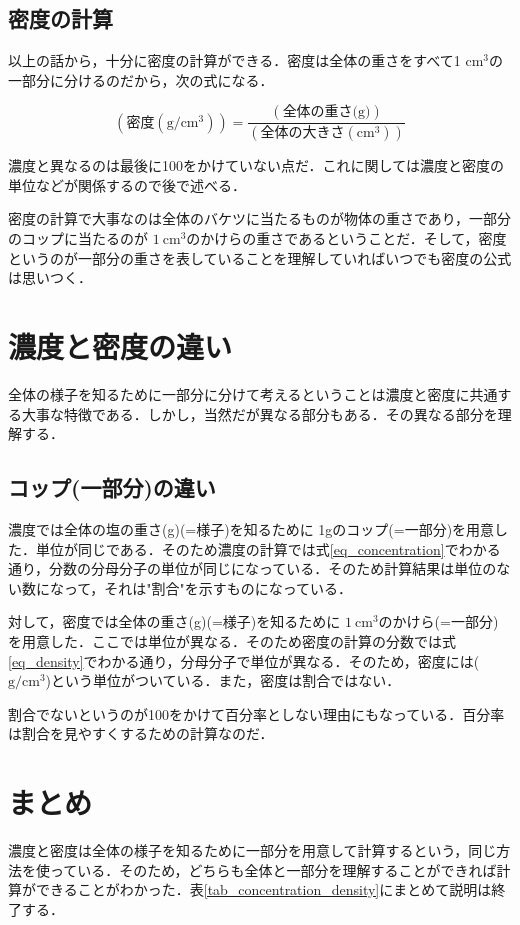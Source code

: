 \documentclass[dvipdfmx]{jsarticle}
\begin{document}
    \subsection{密度の計算}
    以上の話から，十分に密度の計算ができる．密度は全体の重さをすべて1 \(\mathrm{cm}^3\)の一部分に分けるのだから，次の式になる．

    \begin{equation}
        (\text{密度}(\mathrm{g}/\mathrm{cm}^3)) = \frac{(\text{全体の重さ(g)})}{(\text{全体の大きさ}(\mathrm{cm}^3))}
        \label{eq_density}
    \end{equation}

    濃度と異なるのは最後に100をかけていない点だ．これに関しては濃度と密度の単位などが関係するので後で述べる．

    密度の計算で大事なのは全体のバケツに当たるものが物体の重さであり，一部分のコップに当たるのが \(1\ \mathrm{cm}^3\)のかけらの重さであるということだ．そして，密度というのが一部分の重さを表していることを理解していればいつでも密度の公式は思いつく．


    \section{濃度と密度の違い}
    全体の様子を知るために一部分に分けて考えるということは濃度と密度に共通する大事な特徴である．しかし，当然だが異なる部分もある．その異なる部分を理解する．

    \subsection{コップ(一部分)の違い}
    濃度では全体の塩の重さ(g)(=様子)を知るために 1gのコップ(=一部分)を用意した．単位が同じである．そのため濃度の計算では式\eqref{eq_concentration}でわかる通り，分数の分母分子の単位が同じになっている．そのため計算結果は単位のない数になって，それは"割合"を示すものになっている．

    対して，密度では全体の重さ(g)(=様子)を知るために \(1\ \mathrm{cm}^3\)のかけら(=一部分)を用意した．ここでは単位が異なる．そのため密度の計算の分数では式\eqref{eq_density}でわかる通り，分母分子で単位が異なる．そのため，密度には(\(\mathrm{g}/\mathrm{cm}^3\))という単位がついている．また，密度は割合ではない．

    割合でないというのが100をかけて百分率としない理由にもなっている．百分率は割合を見やすくするための計算なのだ．

    \section*{まとめ}
    濃度と密度は全体の様子を知るために一部分を用意して計算するという，同じ方法を使っている．そのため，どちらも全体と一部分を理解することができれば計算ができることがわかった．表\ref{tab_concentration_density}にまとめて説明は終了する．
\end{document}
